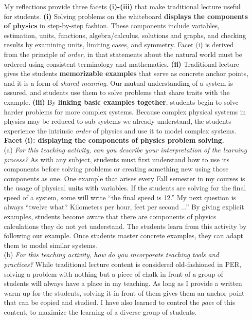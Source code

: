 \documentclass[../../../main.tex]{subfiles}
\begin{document}
My reflections provide three facets \textbf{(i)-(iii)} that make traditional lecture useful for students. \textbf{(i)} Solving problems on the whiteboard \textbf{displays the components of physics} in step-by-step fashion.  These components include variables, estimation, units, functions, algebra/calculus, solutions and graphs, and checking results by examining units, limiting cases, and symmetry.  Facet (i) is derived from the principle of \textit{order,} in that statements about the natural world must be ordered using consistent terminology and mathematics. \textbf{(ii)} Traditional lecture gives the students \textbf{memorizable examples} that serve as concrete anchor points, and it is a form of \textit{shared meaning}.  Our mutual understanding of a system is assured, and students use them to solve problems that share traits with the example.  \textbf{(iii)} By \textbf{linking basic examples together}, students begin to solve harder problems for more complex systems.  Because complex physical systems in physics may be reduced to sub-systems we already understand, the students experience the intrinsic \textit{order} of physics and use it to model complex systems.
\\
\vspace{0.25cm}
\textbf{Facet (i): displaying the components of physics problem solving.}
\\
\vspace{0.25cm}
(a) \textit{For this teaching activity, can you describe your interpretation of the learning process?}  As with any subject, students must first understand how to use its components before solving problems or creating something new using those components as one.  One example that arises every Fall semester in my courses is the usage of physical units with variables.  If the students are solving for the final speed of a system, some will write ``the final speed is 12.''  My next question is always ``twelve what? Kilometers per hour, feet per second ...'' By giving explicit examples, students become aware that there are components of physics calculations they do not yet understand.  The students learn from this activity by following our example.  Once students master concrete examples, they can adapt them to model similar systems.
\\
\vspace{0.25cm}
(b) \textit{For this teaching activity, how do you incorporate teaching tools and practices?} While traditional lecture content is considered old-fashioned in PER, solving a problem with nothing but a piece of chalk in front of a group of students will always have a place in my teaching.  As long as I provide a written warm up for the students, solving it in front of them gives them an anchor point that can be copied and studied.  I have also learned to control the \textit{pace} of this content, to maximize the learning of a diverse group of students.
\end{document}
